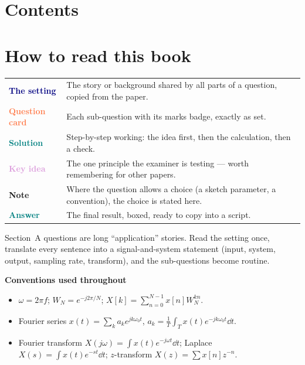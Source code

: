 \documentclass[11pt,a4paper,oneside,openany]{book}
\begin{document}
\pagestyle{plain}
\chapter*{Contents}
\renewcommand{\contentsname}{}
\vspace{-1.6cm}
\tableofcontents
\clearpage

\chapter*{How to read this book}
\begin{tabularx}{\textwidth}{@{}>{\sffamily\bfseries\small}p{3.2cm}X@{}}
\textcolor{navy}{The setting} & The story or background shared by all parts of a question, copied from the paper.\\[3pt]
\textcolor{coral}{Question card} & Each sub-question with its marks badge, exactly as set.\\[3pt]
\textcolor{teal}{Solution} & Step-by-step working: the idea first, then the calculation, then a check.\\[3pt]
\textcolor{plum}{Key idea} & The one principle the examiner is testing --- worth remembering for other papers.\\[3pt]
\textcolor{notebd}{Note} & Where the question allows a choice (a sketch parameter, a convention), the choice is stated here.\\[3pt]
\colorbox{ansbg}{\textcolor{teal}{Answer}} & The final result, boxed, ready to copy into a script.\\
\end{tabularx}

\medskip
\begin{keyidea}Section~A questions are long ``application'' stories. Read the setting once, translate every sentence into a signal-and-system statement (input, system, output, sampling rate, transform), and the sub-questions become routine.\end{keyidea}

\medskip
{\sffamily\small\bfseries\color{navy}Conventions used throughout}
\begin{itemize}[leftmargin=1.4em,itemsep=1pt]
\item $\omega=2\pi f$; $W_N=e^{-j2\pi/N}$; $X[k]=\sum_{n=0}^{N-1}x[n]W_N^{kn}$.
\item Fourier series $x(t)=\sum_k a_ke^{jk\omega_0t}$, $a_k=\frac1T\int_Tx(t)e^{-jk\omega_0t}\dd t$.
\item Fourier transform $X(j\omega)=\int x(t)e^{-j\omega t}\dd t$; Laplace $X(s)=\int x(t)e^{-st}\dd t$; $z$-transform $X(z)=\sum x[n]z^{-n}$.
\end{itemize}
\end{document}
